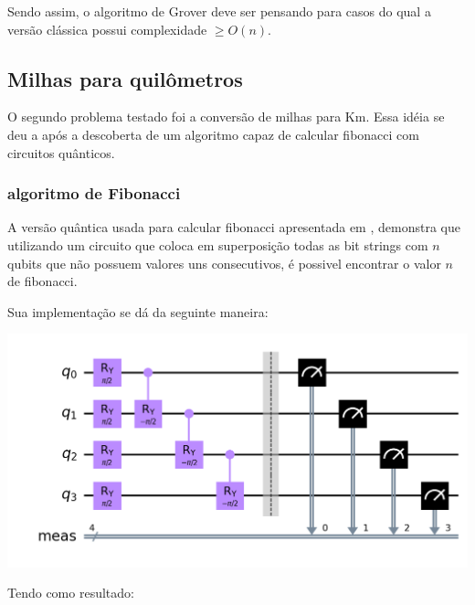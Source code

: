 \documentclass{article}
\begin{document}
Sendo assim, o algoritmo de Grover deve ser pensando para casos do qual a versão clássica possui complexidade $\ge O(n)$.


\subsection{Milhas para quilômetros}

O segundo problema testado foi a conversão de milhas para Km. Essa idéia se deu a após a descoberta de um algoritmo capaz de calcular fibonacci com circuitos quânticos.

\subsubsection{algoritmo de Fibonacci}

A versão quântica usada para calcular fibonacci apresentada em \cite{gilliam2020canonical}, demonstra que utilizando um circuito que coloca em superposição todas as bit strings com $n$ qubits que não possuem valores uns consecutivos, é possivel encontrar o valor $n$ de fibonacci.

Sua implementação se dá da seguinte maneira:

\begin{center}
	\includegraphics[scale=0.3]{fibonacci-circuit.png}
	\label{fig:fibonacci-circuit}
\end{center}

Tendo como resultado:
\end{document}

